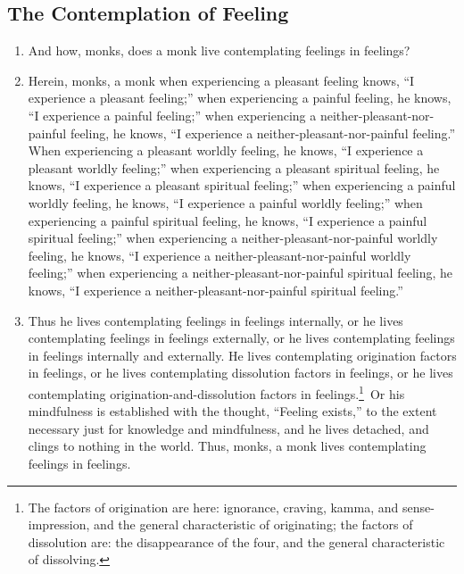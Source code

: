 \subsection*{The Contemplation of Feeling}
\begin{enumerate}[resume]
\item And how, monks, does a monk live contemplating feelings in feelings?
\item Herein, monks, a monk when experiencing a pleasant feeling knows, “I experience a pleasant feeling;” when experiencing a painful feeling, he knows, “I experience a painful feeling;” when experiencing a neither-pleasant-nor-painful feeling, he knows, “I experience a neither-pleasant-nor-painful feeling.” When experiencing a pleasant worldly feeling, he knows, “I experience a pleasant worldly feeling;” when experiencing a pleasant spiritual feeling, he knows, “I experience a pleasant spiritual feeling;” when experiencing a painful worldly feeling, he knows, “I experience a painful worldly feeling;” when experiencing a painful spiritual feeling, he knows, “I experience a painful spiritual feeling;” when experiencing a neither-pleasant-nor-painful worldly feeling, he knows, “I experience a neither-pleasant-nor-painful worldly feeling;” when experiencing a neither-pleasant-nor-painful spiritual feeling, he knows, “I experience a neither-pleasant-nor-painful spiritual feeling.”
\item Thus he lives contemplating feelings in feelings internally, or he lives contemplating feelings in feelings externally, or he lives contemplating feelings in feelings internally and externally. He lives contemplating origination factors in feelings, or he lives contemplating dissolution factors in feelings, or he lives contemplating origination-and-dissolution factors in feelings.\footnote{The factors of origination are here: ignorance, craving, kamma, and sense-impression, and the general characteristic of originating; the factors of dissolution are: the disappearance of the four, and the general characteristic of dissolving.} Or his mindfulness is established with the thought, “Feeling exists,” to the extent necessary just for knowledge and mindfulness, and he lives detached, and clings to nothing in the world. Thus, monks, a monk lives contemplating feelings in feelings.
\end{enumerate}
